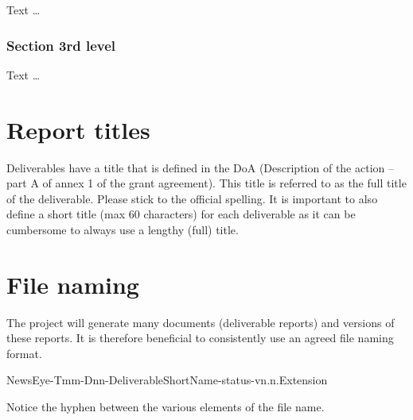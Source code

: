 \documentclass{newseye_del}
\begin{document}
Text \dots

\subsubsection{Section 3rd level}

Text \dots

\section{Report titles}

Deliverables have a title that is defined in the DoA (Description of the  action
-- part A of annex 1 of the grant agreement). This title is referred  to as the
full title of the deliverable. Please stick to the official spelling. It is
important to also define a short title (max 60 characters) for each deliverable
as it can be cumbersome to always use a lengthy (full) title.

\section{File naming}

The project will generate many documents (deliverable reports) and versions of
these reports. It is therefore beneficial to consistently use an agreed file
naming format.

NewsEye-Tmm-Dnn-DeliverableShortName-status-vn.n.Extension

Notice the hyphen between the various elements of the file name.
\end{document}
